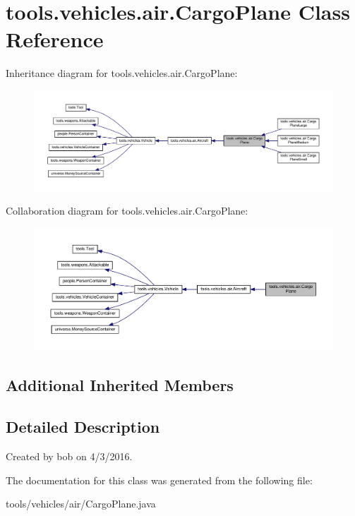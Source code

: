 \hypertarget{classtools_1_1vehicles_1_1air_1_1_cargo_plane}{}\section{tools.\+vehicles.\+air.\+Cargo\+Plane Class Reference}
\label{classtools_1_1vehicles_1_1air_1_1_cargo_plane}


Inheritance diagram for tools.\+vehicles.\+air.\+Cargo\+Plane\+:\nopagebreak
\begin{figure}[H]
\begin{center}
\leavevmode
\includegraphics[width=350pt]{classtools_1_1vehicles_1_1air_1_1_cargo_plane__inherit__graph}
\end{center}
\end{figure}


Collaboration diagram for tools.\+vehicles.\+air.\+Cargo\+Plane\+:\nopagebreak
\begin{figure}[H]
\begin{center}
\leavevmode
\includegraphics[width=350pt]{classtools_1_1vehicles_1_1air_1_1_cargo_plane__coll__graph}
\end{center}
\end{figure}
\subsection*{Additional Inherited Members}


\subsection{Detailed Description}
Created by bob on 4/3/2016. 

The documentation for this class was generated from the following file\+:\begin{DoxyCompactItemize}
\item 
tools/vehicles/air/Cargo\+Plane.\+java\end{DoxyCompactItemize}
